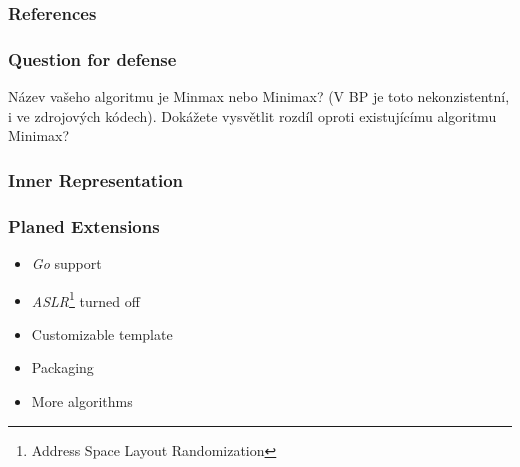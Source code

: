 \documentclass[10pt,xcolor=svgnames,pdflatex]{beamer}
\begin{document}
\begin{frame}[allowframebreaks]
	\frametitle{References}
	\printbibliography
\end{frame}


\appendix

\begin{frame}\frametitle{Question for defense}
    Název vašeho algoritmu je Minmax nebo Minimax? (V BP je toto nekonzistentní, i ve zdrojových kódech). Dokážete vysvětlit rozdíl oproti existujícímu algoritmu Minimax?
\end{frame}

\begin{frame}\frametitle{Inner Representation}
  \begin{figure}[h]
  \centering
  \label{fig:tikz:IDStree}
\end{figure}
\end{frame}

\begin{frame}\frametitle{Planed Extensions}
  \begin{itemize}
    \item \emph{Go} support
    \item \emph{ASLR}\footnote{Address Space Layout Randomization} turned off
    \item Customizable template
    \item Packaging
    \item More algorithms
  \end{itemize}
\end{frame}
\end{document}
